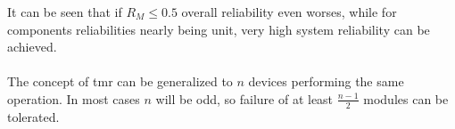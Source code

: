 It can be seen that if $R_M \leq 0.5$ overall reliability even worses, while for components reliabilities nearly being unit, very high system reliability can
be achieved.
\\
\\
The concept of \gls{tmr} can be generalized to $n$ devices performing
the same operation. In most cases $n$ will be odd, so failure of at least $\frac{n-1}{2}$ modules can be tolerated.


